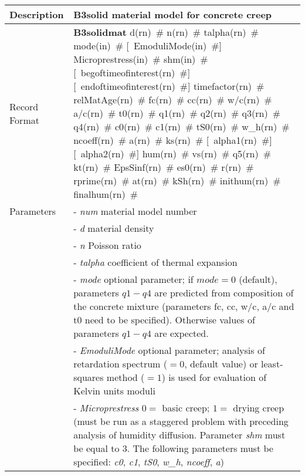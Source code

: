 \documentclass[a4paper]{article}
\newcommand{\descitem}[1]{{\noindent \bf #1}}
\newcommand{\elemparam}[2]{{{#1\tiny (#2)}~\#}}
\newcommand{\optelemparam}[2]{[{~\elemparam{#1}{#2}}]}
\newcommand{\param}[1]{{\it #1}}
\newenvironment{mmt}{\begin{tabular}{|l|p{9cm}|}}{\end{tabular}\\}
\newenvironment{mmt}{\begin{tabular}{|l|l|}}{\end{tabular}\\}
\begin{document}
\begin{table}[!htb]
\begin{mmt}
\hline
Description & B3solid material model  for concrete creep\\
\hline
Record Format & \descitem{B3solidmat} 
\elemparam{d}{rn} \elemparam{n}{rn} \elemparam{talpha}{rn}
%
\elemparam{mode}{in} 
\optelemparam{EmoduliMode}{in} 
\elemparam{Microprestress}{in}
\elemparam{shm}{in} 
\optelemparam{begoftimeofinterest}{rn} \optelemparam{endoftimeofinterest}{rn} \elemparam{timefactor}{rn} \elemparam{relMatAge}{rn}
\elemparam{fc}{rn} \elemparam{cc}{rn} \elemparam{w/c}{rn} \elemparam{a/c}{rn} \elemparam{t0}{rn} %
\elemparam{q1}{rn} \elemparam{q2}{rn} \elemparam{q3}{rn} \elemparam{q4}{rn} %
%
\elemparam{c0}{rn} \elemparam{c1}{rn} \elemparam{tS0}{rn} %
\elemparam{w\_h}{rn} \elemparam{ncoeff}{rn} \elemparam{a}{rn}
%
\elemparam{ks}{rn} 
\optelemparam{alpha1}{rn} \optelemparam{alpha2}{rn} \elemparam{hum}{rn} \elemparam{vs}{rn}
\elemparam{q5}{rn} \elemparam{kt}{rn} \elemparam{EpsSinf}{rn}
\elemparam{es0}{rn} \elemparam{r}{rn} \elemparam{rprime}{rn} \elemparam{at}{rn}     
\elemparam{kSh}{rn}
\elemparam{inithum}{rn} \elemparam{finalhum}{rn}\\
%             
Parameters 
&- \param{num} material model number\\
&- \param{d} material density\\
&- \param{n} Poisson ratio\\
&- \param{talpha} coefficient of thermal expansion\\

&- \param{mode} optional parameter; if $mode = 0$ (default),  parameters $q1-q4$ are predicted from composition of the concrete mixture (parameters fc, cc, w/c, a/c and t0 need to be specified). Otherwise values of parameters $q1-q4$ are expected.\\
&- \param{EmoduliMode} optional parameter; analysis of retardation spectrum ($=0$, default value) or least-squares method ($=1$) is used for evaluation of Kelvin units moduli\\
&- \param{Microprestress} $0=$ basic creep; $1=$ drying creep (must be run as a staggered problem with preceding analysis of humidity diffusion. Parameter \param{shm} must be equal to 3. The following parameters must be specified: \param{c0}, \param{c1}, \param{tS0}, \param{w\_h}, \param{ncoeff}, \param{a})\\


\end{mmt}
\end{table}
\end{document}
